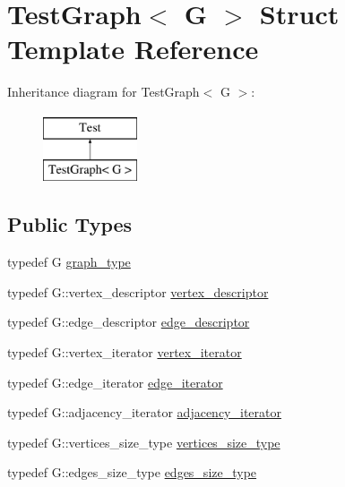 \hypertarget{structTestGraph}{\section{Test\-Graph$<$ G $>$ Struct Template Reference}
\label{structTestGraph}
}
Inheritance diagram for Test\-Graph$<$ G $>$\-:\begin{figure}[H]
\begin{center}
\leavevmode
\includegraphics[height=2.000000cm]{structTestGraph}
\end{center}
\end{figure}
\subsection*{Public Types}
\begin{DoxyCompactItemize}
\item 
typedef G \hyperlink{structTestGraph_a149d9d185e2299b108590e2f83804351}{graph\-\_\-type}
\item 
typedef G\-::vertex\-\_\-descriptor \hyperlink{structTestGraph_aa82e61846643af7ce36a6993b81b9aa3}{vertex\-\_\-descriptor}
\item 
typedef G\-::edge\-\_\-descriptor \hyperlink{structTestGraph_aa20b87dd86a6d46d79cd5eead7e3ecd8}{edge\-\_\-descriptor}
\item 
typedef G\-::vertex\-\_\-iterator \hyperlink{structTestGraph_ae82be295babd001adfdf636fc39a79f8}{vertex\-\_\-iterator}
\item 
typedef G\-::edge\-\_\-iterator \hyperlink{structTestGraph_a4a62a3acea29caad985cde5504e4222d}{edge\-\_\-iterator}
\item 
typedef G\-::adjacency\-\_\-iterator \hyperlink{structTestGraph_af50caf6f726568b4165d4a1dc5b75cc3}{adjacency\-\_\-iterator}
\item 
typedef G\-::vertices\-\_\-size\-\_\-type \hyperlink{structTestGraph_a808d6ca09652f1c14f6a68ca42beb447}{vertices\-\_\-size\-\_\-type}
\item 
typedef G\-::edges\-\_\-size\-\_\-type \hyperlink{structTestGraph_a308c6aa7034bf56790d592b0fc259851}{edges\-\_\-size\-\_\-type}
\end{DoxyCompactItemize}


